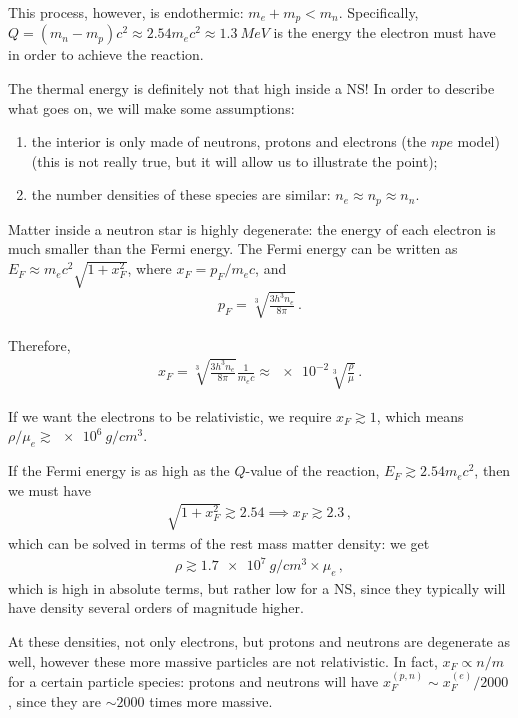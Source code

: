 \documentclass[main.tex]{subfiles}
\begin{document}
This process, however, is endothermic: \(m_e + m_p < m_n \). 
Specifically, \(Q = (m_n - m_p)c^2 \approx 2.54 m_e c^2\approx \SI{1.3}{MeV}\) is the energy the electron must have in order to achieve the reaction. 

The thermal energy is definitely not that high inside a NS!
In order to describe what goes on, we will make some assumptions:
\begin{enumerate}
    \item the interior is only made of neutrons, protons and electrons (the \(npe\) model) (this is not really true, but it will allow us to illustrate the point);
    \item the number densities of these species are similar: \(n_e \approx n_p \approx n_n\). 
\end{enumerate}

Matter inside a neutron star is highly degenerate: the energy of each electron is much smaller than the Fermi energy.
The Fermi energy can be written as \(E_F \approx m_e c^2 \sqrt{1 + x_F^2}\), where \(x_F = p_F / m_ec\), and 
%
\begin{align}
p_F = \sqrt[3]{\frac{3 h^3 n_e}{8 \pi }}
\,.
\end{align}

Therefore, 
%
\begin{align}
x_F = \sqrt[3]{\frac{3 h^3 n_e}{8 \pi }} \frac{1}{m_e c}
\approx \num{e-2} \sqrt[3]{\frac{\rho}{\mu }}
\,.
\end{align}

If we want the electrons to be relativistic, we require \(x_F \gtrsim 1\), which means \(\rho / \mu _e \gtrsim \SI{e6}{g / cm^3}\). 

If the Fermi energy is as high as the \(Q\)-value of the reaction, \(E_F \gtrsim \num{2.54} m_e c^2\), then we must have 
%
\begin{align}
\sqrt{1 + x_F^2} \gtrsim \num{2.54} \implies x_F \gtrsim \num{2.3}
\,,
\end{align}
%
which can be solved in terms of the rest mass matter density: we get 
%
\begin{align}
\rho \gtrsim \SI{1.7e7}{g / cm^3} \times \mu _e
\,,
\end{align}
%
which is high in absolute terms, but rather low for a NS, since they typically will have density several orders of magnitude higher. 

At these densities, not only electrons, but protons and neutrons are degenerate as well, however these more massive particles are not relativistic. 
In fact, \(x_F \propto n / m\) for a certain particle species: protons and neutrons will have \(x_F^{(p, n)} \sim x_F^{(e)} / 2000 \), since they are \(\sim 2000\) times more massive. 
\end{document}
